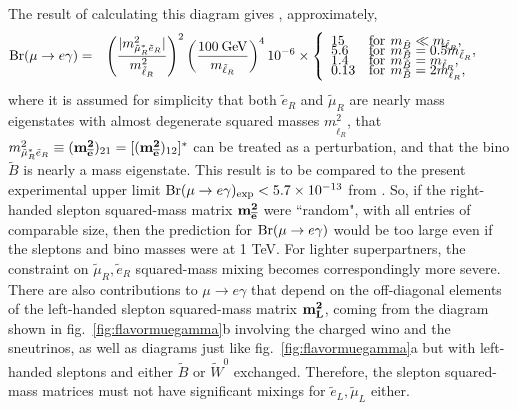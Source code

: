 \documentclass[12pt]{article}
\def\beq{\begin{eqnarray}}
\def\eeq{\end{eqnarray}}
\def\sbar{\overline}
\def\stilde{\widetilde}
\def\Branching{{\rm Br}}
\begin{document}
The result of calculating this diagram gives \cite{muegamma,muegammatwo},
approximately,
\beq 
\Branching (\mu \rightarrow e \gamma) 
&=& 
\left ( \frac{ |m^2_{\tilde \mu^*_R \tilde e_R}| }{m^2_{\tilde \ell_R}} 
\right )^2
\left (\frac{100\>{\rm GeV}}{m_{\tilde \ell_R}} \right )^4 
10^{-6} \times
\left \{ \begin{array}{ll}
15 & {\rm for}\>\, m_{\tilde B} \ll m_{\tilde \ell_R},
\\[-5pt]
5.6 & {\rm for}\>\, m_{\tilde B} = 0.5 m_{\tilde \ell_R},
\\[-5pt]
1.4 & {\rm for}\>\, m_{\tilde B} = m_{\tilde \ell_R},
\\[-5pt]
0.13 & {\rm for}\>\, m_{\tilde B} = 2 m_{\tilde \ell_R},
\end{array}
\right. 
\phantom{xxx}
\label{eq:muegamma}
\eeq
where it is assumed for simplicity that both $\tilde e_R$ and $\tilde
\mu_R$ are nearly mass eigenstates with almost degenerate squared masses
$m^2_{\tilde \ell_R}$, that $m^2_{\tilde \mu_R^* \tilde e_R} \equiv ({\bf
m^2_{\sbar e}})_{21} = [({\bf m^2_{\sbar e}})_{12}]^*$ can be treated as a
perturbation, and that the bino $\stilde B$ is nearly a mass eigenstate. This
result is to be compared to the present experimental upper limit 
$\Branching (\mu \rightarrow e \gamma)_{\rm exp} < 5.7\times 10^{-13}$ from
\cite{muegammaexperiment}. So, if the right-handed slepton squared-mass
matrix ${\bf m^2_{\sbar e}}$ were ``random", with all entries of
comparable size, then the prediction for $\Branching (\mu\rightarrow e\gamma)$
would be too large even if the sleptons and bino masses were at 1 TeV. 
For lighter superpartners, the constraint on $\tilde \mu_R, \tilde e_R$
squared-mass mixing becomes correspondingly more severe. There are also
contributions to $\mu \rightarrow e \gamma$ that depend on the
off-diagonal elements of the left-handed slepton squared-mass matrix $\bf
m^2_L$, coming from the 
diagram shown in fig.~\ref{fig:flavormuegamma}b 
involving the charged wino and the sneutrinos, as well as
diagrams just like fig.~\ref{fig:flavormuegamma}a but with left-handed
sleptons and either $\stilde B$ or $\stilde W^0$ exchanged.
Therefore, the slepton
squared-mass matrices must not have significant mixings for $\stilde
e_L,\stilde\mu_L$ either. 
\end{document}
